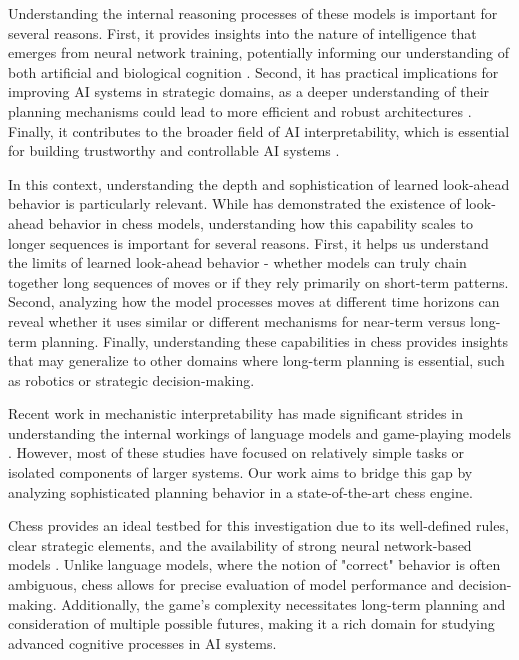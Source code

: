 \documentclass{article}
\begin{document}
Understanding the internal reasoning processes of these models is important for several reasons. First, it provides insights into the nature of intelligence that emerges from neural network training, potentially informing our understanding of both artificial and biological cognition \citep{mcgrath2021acquisition}. Second, it has practical implications for improving AI systems in strategic domains, as a deeper understanding of their planning mechanisms could lead to more efficient and robust architectures \citep{czech2023representation}. Finally, it contributes to the broader field of AI interpretability, which is essential for building trustworthy and controllable AI systems \citep{chattopadhyay2019neural}.

In this context, understanding the depth and sophistication of learned look-ahead behavior is particularly relevant. While \citet{jenner2024evidence} has demonstrated the existence of look-ahead behavior in chess models, understanding how this capability scales to longer sequences is important for several reasons. First, it helps us understand the limits of learned look-ahead behavior - whether models can truly chain together long sequences of moves or if they rely primarily on short-term patterns. Second, analyzing how the model processes moves at different time horizons can reveal whether it uses similar or different mechanisms for near-term versus long-term planning. Finally, understanding these capabilities in chess provides insights that may generalize to other domains where long-term planning is essential, such as robotics or strategic decision-making.

Recent work in mechanistic interpretability has made significant strides in understanding the internal workings of language models \citep{geva2023dissecting,wang2023label} and game-playing models \citep{li2022emergent,nanda2023emergent}. However, most of these studies have focused on relatively simple tasks or isolated components of larger systems. Our work aims to bridge this gap by analyzing sophisticated planning behavior in a state-of-the-art chess engine.

Chess provides an ideal testbed for this investigation due to its well-defined rules, clear strategic elements, and the availability of strong neural network-based models \citep{ruoss2024grandmasterlevel}. Unlike language models, where the notion of "correct" behavior is often ambiguous, chess allows for precise evaluation of model performance and decision-making. Additionally, the game's complexity necessitates long-term planning and consideration of multiple possible futures, making it a rich domain for studying advanced cognitive processes in AI systems.
\end{document}
